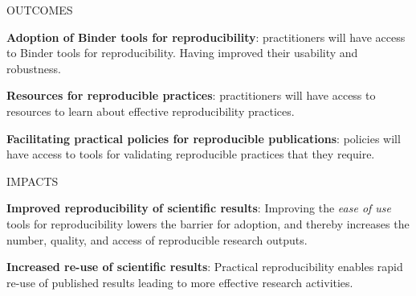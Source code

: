 \begin{multicols}{2}
\begin{summarybox}{OUTCOMES}

\textbf{Adoption of Binder tools for reproducibility}:
practitioners will have access to Binder tools for reproducibility.
Having improved their usability and robustness.

\textbf{Resources for reproducible practices}:
practitioners will have access to resources to learn about effective reproducibility practices.

\textbf{Facilitating practical policies for reproducible publications}:
policies will have access to tools for validating reproducible practices that they require.
\end{summarybox}

\begin{summarybox}{IMPACTS}

\textbf{Improved reproducibility of scientific results}: Improving the \emph{ease of use} tools for reproducibility
lowers the barrier for adoption, and thereby increases the number, quality, and
access of reproducible research outputs.

\textbf{Increased re-use of scientific results}: Practical reproducibility
enables rapid re-use of published results leading to more effective research activities.
\end{summarybox}
\end{multicols}
\clearpage

%

%





